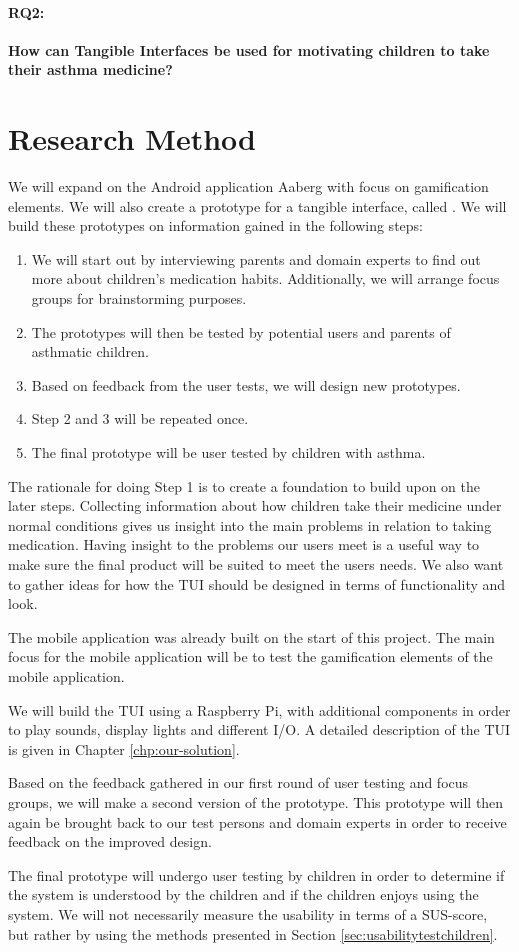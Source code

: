 \paragraph{RQ2:}
\textbf{How can Tangible Interfaces be used for motivating children to take their asthma medicine?}


\section{Research Method}
\label{sec:researchmethod}
We will expand on the Android application Aaberg \etal{} with focus on gamification elements. We will also create a prototype for a tangible interface, called \buddy{}. We will build these prototypes on information gained in the following steps:

\begin{enumerate}
  \item We will start out by interviewing parents and domain experts to find out more about children's medication habits. Additionally, we will arrange focus groups for brainstorming purposes.
  \item The prototypes will then be tested by potential users and parents of asthmatic children. 
  \item Based on feedback from the user tests, we will design new prototypes.
  \item Step 2 and 3 will be repeated once. 
  \item The final prototype will be user tested by children with asthma. 
\end{enumerate}
  
The rationale for doing Step 1 is to create a foundation to build upon on the later steps. 
Collecting information about how children take their medicine under normal conditions gives us insight into the main problems in relation to taking medication. Having insight to the problems our users meet is a useful way to make sure the final product will be suited to meet the users needs. We also want to gather ideas for how the TUI should be designed in terms of functionality and look.

The mobile application was already built on the start of this project. The main focus for the mobile application will be to test the gamification elements of the mobile application. 

We will build the TUI using a Raspberry Pi, with additional components in order to play sounds, display lights and different I/O. A detailed description of the TUI is given in Chapter \ref{chp:our-solution}. 


Based on the feedback gathered in our first round of user testing and focus groups, we will make a second version of the prototype. This prototype will then again be brought back to our test persons and domain experts in order to receive feedback on the improved design.

The final prototype will undergo user testing by children in order to determine if the system is understood by the children and if the children enjoys using the system. We will not necessarily measure the usability in terms of a SUS-score\cite{brooke1996sus}, but rather by using the methods presented in Section \ref{sec:usabilitytestchildren}.
